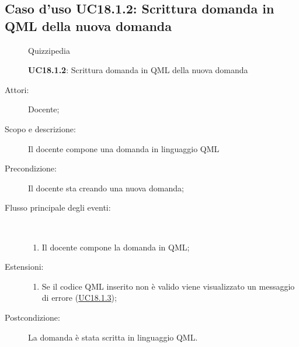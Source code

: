 \subsection{Caso d'uso UC18.1.2: Scrittura domanda in QML della nuova domanda}
	\begin{figure}[H]
		\centering
		\begin{resizedtikzpicture}{\textwidth}
		\begin{umlsystem}[x=0, fill=lightgray!20]{Quizzipedia}
		\end{umlsystem}
		\end{resizedtikzpicture}
		\caption{\textbf{UC18.1.2}: Scrittura domanda in QML della nuova domanda}
		\label{UC18.1.2}
	\end{figure}
\begin{description}
\item[Attori:] Docente;
\item[Scopo e descrizione:] Il docente compone una domanda in linguaggio QML
      \item[Precondizione:] Il docente sta creando una nuova domanda;

        \item[Flusso principale degli eventi:] \ 
 \begin{enumerate}
          \item Il docente compone la domanda in QML;

      \end{enumerate}
    \item[Estensioni:]
      \begin{enumerate}
          \item Se il codice QML inserito non è valido viene visualizzato un messaggio di errore (\hyperlink{UC18.1.3}{UC18.1.3});

      \end{enumerate}
    \item[Postcondizione:] La domanda è stata scritta in linguaggio QML.
  \end{description}
\hypertarget{UC18.1.3}{}
